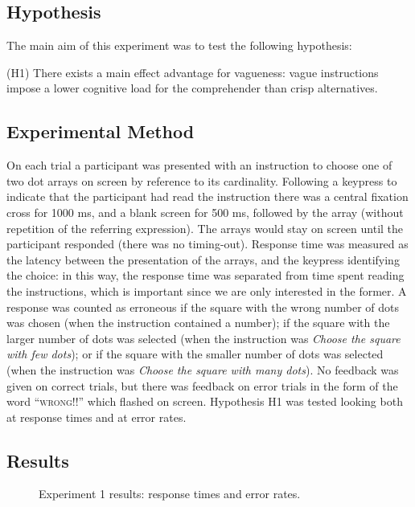 \documentclass[%
man,		%
floatsintext,%
apacite%
]{apa6} %
\begin{document}
\subsection{Hypothesis}
\noindent The main aim of this experiment was to test the following hypothesis:
{\small
\begin{APAenumerate}
	\item [(H1)] There exists a main effect advantage for vagueness: vague instructions impose a lower cognitive load for the comprehender than crisp alternatives.
\end{APAenumerate}
}

\subsection{Experimental Method}

On each trial a participant was presented with an instruction to choose one of two dot arrays on screen by reference to its cardinality. 
Following a keypress to indicate that the participant had read the instruction there was a central fixation cross for 1000 ms, and a blank screen for 500 ms, followed by the array (without repetition of the referring expression). 
The arrays would stay on screen until the participant responded (there was no timing-out). 
Response time was measured as the latency between the presentation of the arrays, and the keypress identifying the choice: in this way, the response time was separated from time spent reading the instructions, which is important since we are only interested in the former. 
A response was counted as erroneous if the square with the wrong number of dots was chosen (when the instruction contained a number); 
if the square with the larger number of dots was selected (when the instruction was \emph{Choose the square with few dots}); 
or if the square with the smaller number of dots was selected (when the instruction was \emph{Choose the square with many dots}). 
No feedback was given on correct trials, but there was feedback on error trials in the form of the word ``\textsc{wrong!!}'' which flashed on screen. Hypothesis H1 was tested looking both at response times and at error rates.

\subsection{Results}

\begin{figure}[htbp]
\caption{Experiment 1 results: response times and error rates.}
\label{resultse1}
\end{figure}
\end{document}
